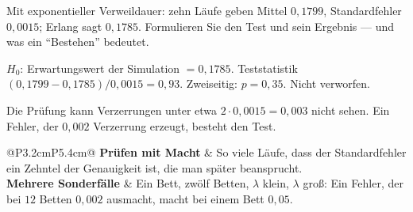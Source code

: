 \begin{aufgabe}
Mit exponentieller Verweildauer: zehn Läufe geben Mittel $0{,}1799$, Standardfehler $0{,}0015$; Erlang sagt $0{,}1785$. Formulieren Sie den Test und sein Ergebnis --- und was ein \enquote{Bestehen} bedeutet.

\loesung
{}
$H_0$: Erwartungswert der Simulation $= 0{,}1785$. Teststatistik $(0{,}1799-0{,}1785)/0{,}0015 = 0{,}93$. Zweiseitig: $p = 0{,}35$. Nicht verworfen.

Die Prüfung kann Verzerrungen unter etwa $2\cdot0{,}0015 = 0{,}003$ nicht sehen. Ein Fehler, der $0{,}002$ Verzerrung erzeugt, besteht den Test.

\begin{center}
{\small
\renewcommand{\arraystretch}{1.5}
\begin{tabular}{@{}P{3.2cm}P{5.4cm}@{}}
\toprule
\textbf{Prüfen mit Macht} & So viele Läufe, dass der Standardfehler ein Zehntel der Genauigkeit ist, die man später beansprucht.\\
\textbf{Mehrere Sonderfälle} & Ein Bett, zwölf Betten, $\lambda$ klein, $\lambda$ groß: Ein Fehler, der bei $12$ Betten $0{,}002$ ausmacht, macht bei einem Bett $0{,}05$.\\
\bottomrule
\end{tabular}}
\end{center}

\begin{center}
\begin{minipage}{0.88\textwidth}
\end{minipage}
\end{center}
\end{aufgabe}

